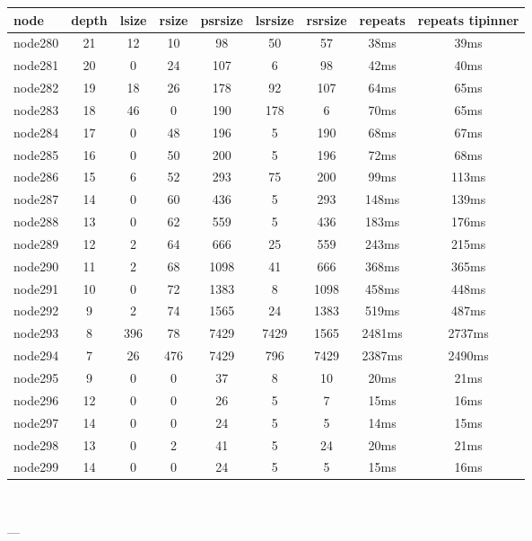 \begin{tabular}{|l|c|c|c|c|c|c|c|c|}
\hline node & depth & lsize & rsize & psrsize & lsrsize & rsrsize   & repeats & repeats tipinner\\
    \hline node280 & 21 & 12 & 10 & 98 & 50 & 57 & 38ms & 39ms\\
    \hline node281 & 20 & 0 & 24 & 107 & 6 & 98 & 42ms & 40ms\\
    \hline node282 & 19 & 18 & 26 & 178 & 92 & 107 & 64ms & 65ms\\
    \hline node283 & 18 & 46 & 0 & 190 & 178 & 6 & 70ms & 65ms\\
    \hline node284 & 17 & 0 & 48 & 196 & 5 & 190 & 68ms & 67ms\\
    \hline node285 & 16 & 0 & 50 & 200 & 5 & 196 & 72ms & 68ms\\
    \hline node286 & 15 & 6 & 52 & 293 & 75 & 200 & 99ms & 113ms\\
    \hline node287 & 14 & 0 & 60 & 436 & 5 & 293 & 148ms & 139ms\\
    \hline node288 & 13 & 0 & 62 & 559 & 5 & 436 & 183ms & 176ms\\
    \hline node289 & 12 & 2 & 64 & 666 & 25 & 559 & 243ms & 215ms\\
    \hline node290 & 11 & 2 & 68 & 1098 & 41 & 666 & 368ms & 365ms\\
    \hline node291 & 10 & 0 & 72 & 1383 & 8 & 1098 & 458ms & 448ms\\
    \hline node292 & 9 & 2 & 74 & 1565 & 24 & 1383 & 519ms & 487ms\\
    \hline node293 & 8 & 396 & 78 & 7429 & 7429 & 1565 & 2481ms & 2737ms\\
    \hline node294 & 7 & 26 & 476 & 7429 & 796 & 7429 & 2387ms & 2490ms\\
    \hline node295 & 9 & 0 & 0 & 37 & 8 & 10 & 20ms & 21ms\\
    \hline node296 & 12 & 0 & 0 & 26 & 5 & 7 & 15ms & 16ms\\
    \hline node297 & 14 & 0 & 0 & 24 & 5 & 5 & 14ms & 15ms\\
    \hline node298 & 13 & 0 & 2 & 41 & 5 & 24 & 20ms & 21ms\\
    \hline node299 & 14 & 0 & 0 & 24 & 5 & 5 & 15ms & 16ms\\

\hline
\end{tabular} \

---


